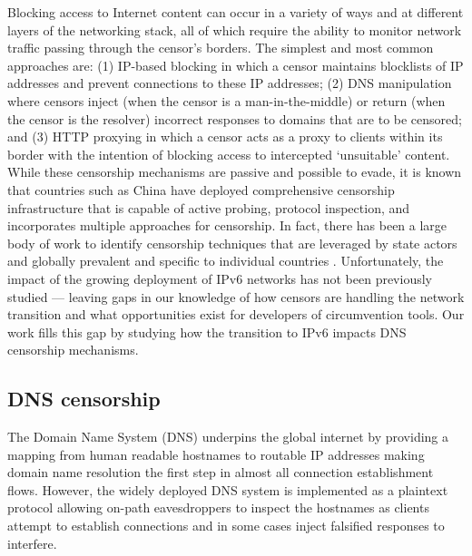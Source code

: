 %
Blocking access to Internet content can occur in a variety of ways and at
different layers of the networking stack, all of which require the ability to
monitor network traffic passing through the censor's borders. The simplest and
most common approaches are: (1) IP-based blocking in which a censor maintains
blocklists of IP addresses and prevent connections to these IP addresses; (2)
DNS manipulation where censors inject (when the censor is a man-in-the-middle)
or return (when the censor is the resolver) incorrect responses to domains that
are to be censored; and (3) HTTP proxying in which a censor acts as a proxy to
clients within its border with the intention of blocking access to intercepted
`unsuitable' content. 
%
While these censorship mechanisms are passive and possible to evade, it is
known that countries such as China have deployed comprehensive censorship
infrastructure that is capable of active probing, protocol inspection, and
incorporates multiple approaches for censorship.
%
In fact, there has been a large body of work to identify censorship techniques
that are leveraged by state actors and globally prevalent
\cite{pearce2017global, niaki2020iclab, scott2016satellite,
sundara2020censored, filasto2012ooni, pearce2017augur, razaghpanah2016exploring}
and specific to individual countries \cite{USESEC21:GFWatch, aryan2013internet,
ramesh2020decentralized, yadav2018light, gebhart2017internet, nabi2013anatomy}.
%
Unfortunately, the impact of the growing deployment of IPv6 networks has not
been previously studied --- leaving gaps in our knowledge of how censors are
handling the network transition and what opportunities exist for developers of
circumvention tools. Our work fills this gap by studying how the transition to
IPv6 impacts DNS censorship mechanisms.

\subsection{DNS censorship}\label{sec:background:dns}


The Domain Name System (DNS) underpins the global internet by providing
a mapping from human readable hostnames to routable IP addresses making domain
name resolution the first step in almost all connection establishment flows.
However, the widely deployed DNS system is implemented as a plaintext protocol
allowing on-path eavesdroppers to inspect the hostnames as clients attempt to
establish connections and in some cases inject falsified responses to interfere.

